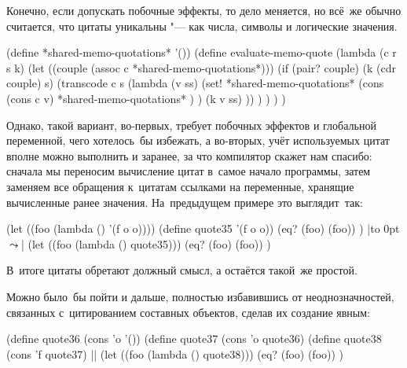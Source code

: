 Конечно, если допускать побочные эффекты, то дело меняется, но всё~же обычно
считается, что цитаты уникальны "--- как числа, символы и логические значения.

\begin{code:lisp}
(define *shared-memo-quotations* '())
(define evaluate-memo-quote
  (lambda (c r s k)
    (let ((couple (assoc c *shared-memo-quotations*)))
      (if (pair? couple)
          (k (cdr couple) s)
          (transcode c s (lambda (v ss)
                           (set! *shared-memo-quotations*
                                 (cons (cons c v)
                                       *shared-memo-quotations* ) )
                           (k v ss) )) ) ) ) )
\end{code:lisp}

Однако, такой вариант, во-первых, требует побочных эффектов и глобальной
переменной, чего хотелось~бы избежать, а во-вторых, учёт используемых цитат
вполне можно выполнить и заранее, за что компилятор скажет нам спасибо: сначала
мы переносим вычисление цитат в~самое начало программы, затем заменяем все
обращения к~цитатам ссылками на переменные, хранящие вычисленные ранее значения.
На~предыдущем примере это выглядит~так:

{\def\T{\hbox to 0pt{$\leadsto$}}
\begin{code:lisp}
(let ((foo (lambda () '(f o o))))    (define quote35 '(f o o))
  (eq? (foo) (foo)) )             |\T|   (let ((foo (lambda () quote35)))
                                       (eq? (foo) (foo)) )
\end{code:lisp}}

В~итоге цитаты обретают должный смысл, а  остаётся такой~же
простой.

Можно было~бы пойти и дальше, полностью избавившись от неоднозначностей,
связанных с~цитированием составных объектов, сделав их создание явным:


\begin{code:lisp}
(define quote36 (cons 'o '())
(define quote37 (cons 'o quote36)
(define quote38 (cons 'f quote37)
||
(let ((foo (lambda () quote38)))
  (eq? (foo) (foo)) )
\end{code:lisp}

